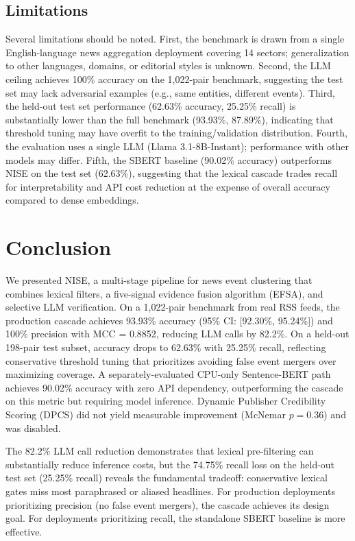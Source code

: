\documentclass[conference]{IEEEtran}
\begin{document}
\subsection{Limitations}
Several limitations should be noted.
First, the benchmark is drawn from a single English-language news aggregation deployment covering 14 sectors; generalization to other languages, domains, or editorial styles is unknown.
Second, the LLM ceiling achieves 100\% accuracy on the 1,022-pair benchmark, suggesting the test set may lack adversarial examples (e.g., same entities, different events).
Third, the held-out test set performance (62.63\% accuracy, 25.25\% recall) is substantially lower than the full benchmark (93.93\%, 87.89\%), indicating that threshold tuning may have overfit to the training/validation distribution.
Fourth, the evaluation uses a single LLM (Llama 3.1-8B-Instant); performance with other models may differ.
Fifth, the SBERT baseline (90.02\% accuracy) outperforms NISE on the test set (62.63\%), suggesting that the lexical cascade trades recall for interpretability and API cost reduction at the expense of overall accuracy compared to dense embeddings.

\section{Conclusion}

We presented NISE, a multi-stage pipeline for news event clustering that combines lexical filters, a five-signal evidence fusion algorithm (EFSA), and selective LLM verification.
On a 1,022-pair benchmark from real RSS feeds, the production cascade achieves 93.93\% accuracy (95\% CI: [92.30\%, 95.24\%]) and 100\% precision with MCC = 0.8852, reducing LLM calls by 82.2\%.
On a held-out 198-pair test subset, accuracy drops to 62.63\% with 25.25\% recall, reflecting conservative threshold tuning that prioritizes avoiding false event mergers over maximizing coverage.
A separately-evaluated CPU-only Sentence-BERT path achieves 90.02\% accuracy with zero API dependency, outperforming the cascade on this metric but requiring model inference.
Dynamic Publisher Credibility Scoring (DPCS) did not yield measurable improvement (McNemar $p = 0.36$) and was disabled.

The 82.2\% LLM call reduction demonstrates that lexical pre-filtering can substantially reduce inference costs, but the 74.75\% recall loss on the held-out test set (25.25\% recall) reveals the fundamental tradeoff: conservative lexical gates miss most paraphrased or aliased headlines.
For production deployments prioritizing precision (no false event mergers), the cascade achieves its design goal.
For deployments prioritizing recall, the standalone SBERT baseline is more effective.
\end{document}
